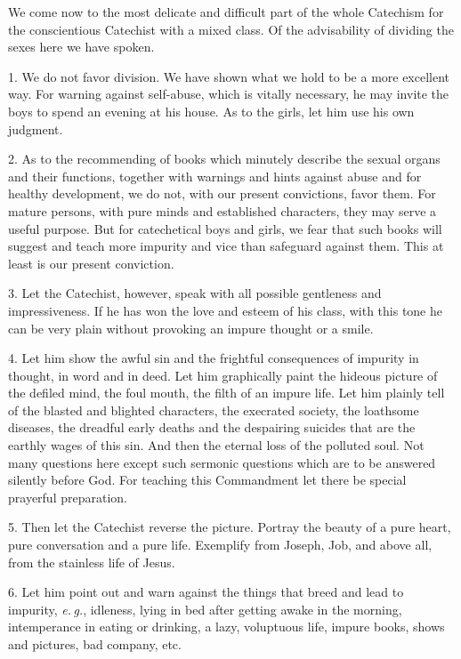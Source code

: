 We come now to the most delicate and difficult part of the whole Catechism for the conscientious Catechist with a mixed class. Of the advisability of dividing the sexes here we have spoken.

 1. We do not favor division. We have shown what we hold to be a more excellent way. For warning against self-abuse, which is vitally necessary, he may invite the boys to spend an evening at his house. As to the girls, let him use his own judgment.

 2. As to the recommending of books which minutely describe the sexual organs and their functions, together with warnings and hints against abuse and for healthy development, we do not, with our present convictions, favor them. For mature persons, with pure minds and established characters, they may serve a useful purpose. But for catechetical boys and girls, we fear that such books will suggest and teach more impurity and vice than safeguard against them. This at least is our present conviction.

3. Let the Catechist, however, speak with all possible
gentleness and impressiveness. If he has won the love and esteem of his class, with this tone he can be very plain without provoking an impure thought or a smile.

 4. Let him show the awful sin and the frightful consequences of impurity in thought, in word and in deed. Let him graphically paint the hideous picture of the defiled mind, the foul mouth, the filth of an impure life. Let him plainly tell of the blasted and blighted characters, the execrated society, the loathsome diseases, the dreadful early deaths and the despairing suicides that are the earthly wages of this sin. And then the eternal loss of the polluted soul. Not many questions here except such sermonic questions which are to be answered silently before God. For teaching this Commandment let there be special prayerful preparation.

5. Then let the Catechist reverse the picture.  Portray the beauty of a pure heart, pure conversation and a pure life. Exemplify from Joseph, Job, and above all, from the stainless life of Jesus.

6. Let him point out and warn against the things that breed and lead to impurity, \emph{e.\,g.}, idleness, lying in bed after getting awake in the morning, intemperance in eating or drinking, a lazy, voluptuous life, impure books, shows and pictures, bad company, etc.

